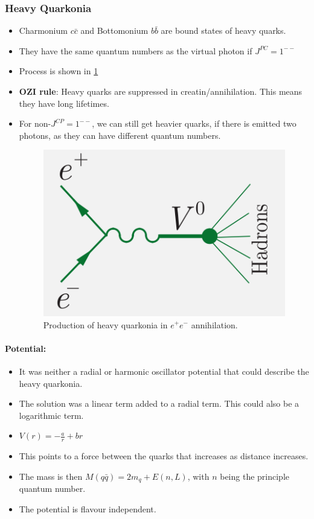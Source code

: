 \subsubsection{Heavy Quarkonia}
\begin{itemize}
    \item Charmonium $c \bar{c}$ and Bottomonium $b \bar{b}$ are bound states of heavy quarks.
    \item They have the same quantum numbers as the virtual photon if $J^{PC} = 1 ^{--}$
    \item Process is shown in \cref{fig: heavy_quarkonia}
    \item \textbf{OZI rule}: Heavy quarks are suppressed in creatin/annihilation. This means they have long lifetimes. 
    \item For non-$J^{CP} = 1^{- - }$, we can still get heavier quarks, if there is emitted two photons, as they can have different quantum numbers.
    
    \begin{figure}[h!]
    \centering
    \includegraphics[width = .6\textwidth]{heavy_quarkonia.png}
    \caption{Production of heavy quarkonia in $e^+e^-$ annihilation.}
    \label{fig: heavy_quarkonia}
    \end{figure}
\end{itemize}

\paragraph{Potential:}
\begin{itemize}
    \item It was neither a radial or harmonic oscillator potential that could describe the heavy quarkonia.
    \item The solution was a linear term added to a radial term. This could also be a logarithmic term.
    \item $V(r) = - \frac{a}{r} + br$
    \item This points to a force between the quarks that increases as distance increases.
    \item The mass is then $M(q \bar{q}) = 2m_{q} + E(n,L)$, with $n$ being the principle quantum number.  
    \item The potential is flavour independent. 
\end{itemize}

